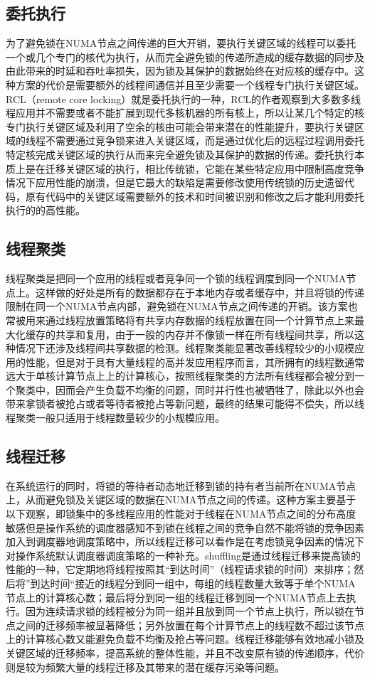 \subsection{委托执行}
为了避免锁在NUMA节点之间传递的巨大开销，要执行关键区域的线程可以委托一个或几个专门的核代为执行，从而完全避免锁的传递所造成的缓存数据的同步及由此带来的时延和吞吐率损失，因为锁及其保护的数据始终在对应核的缓存中。这种方案的代价是需要额外的线程间通信并且至少需要一个线程专门执行关键区域。RCL（remote core locking）就是委托执行的一种，RCL的作者观察到大多数多线程应用并不需要或者不能扩展到现代多核机器的所有核上，所以让某几个特定的核专门执行关键区域及利用了空余的核由可能会带来潜在的性能提升，要执行关键区域的线程不需要通过竞争锁来进入关键区域，而是通过优化后的远程过程调用委托特定核完成关键区域的执行从而来完全避免锁及其保护的数据的传递。委托执行本质上是在迁移关键区域的执行，相比传统锁，它能在某些特定应用中限制高度竞争情况下应用性能的崩溃，但是它最大的缺陷是需要修改使用传统锁的历史遗留代码，原有代码中的关键区域需要额外的技术和时间被识别和修改之后才能利用委托执行的的高性能。
\subsection{线程聚类}
线程聚类是把同一个应用的线程或者竞争同一个锁的线程调度到同一个NUMA节点上。这样做的好处是所有的数据都存在于本地内存或者缓存中，并且将锁的传递限制在同一个NUMA节点内部，避免锁在NUMA节点之间传递的开销。该方案也常被用来通过线程放置策略将有共享内存数据的线程放置在同一个计算节点上来最大化缓存的共享和复用，由于一般的内存并不像锁一样在所有线程间共享，所以这种情况下还涉及线程间共享数据的检测。线程聚类能显著改善线程较少的小规模应用的性能，但是对于具有大量线程的高并发应用程序而言，其所拥有的线程数通常远大于单核计算节点上上的计算核心，按照线程聚类的方法所有线程都会被分到一个聚类中，因而会产生负载不均衡的问题，同时并行性也被牺牲了，除此以外也会带来拿锁者被抢占或者等待者被抢占等新问题，最终的结果可能得不偿失，所以线程聚类一般只适用于线程数量较少的小规模应用。
\subsection{线程迁移}
在系统运行的同时，将锁的等待者动态地迁移到锁的持有者当前所在NUMA节点上，从而避免锁及关键区域的数据在NUMA节点之间的传递。这种方案主要基于以下观察，即锁集中的多线程应用的性能对于线程在NUMA节点之间的分布高度敏感但是操作系统的调度器感知不到锁在线程之间的竞争自然不能将锁的竞争因素加入到调度器地调度策略中，所以线程迁移可以看作是在考虑锁竞争因素的情况下对操作系统默认调度器调度策略的一种补充。shuffling是通过线程迁移来提高锁的性能的一种，它定期地将线程按照其“到达时间”（线程请求锁的时间）来排序；然后将”到达时间“接近的线程分到同一组中，每组的线程数量大致等于单个NUMA节点上的计算核心数；最后将分到同一组的线程迁移到同一个NUMA节点上去执行。因为连续请求锁的线程被分为同一组并且放到同一个节点上执行，所以锁在节点之间的迁移频率被显著降低；另外放置在每个计算节点上的线程数不超过该节点上的计算核心数又能避免负载不均衡及抢占等问题。线程迁移能够有效地减小锁及关键区域的迁移频率，提高系统的整体性能，并且不改变原有锁的传递顺序，代价则是较为频繁大量的线程迁移及其带来的潜在缓存污染等问题。
